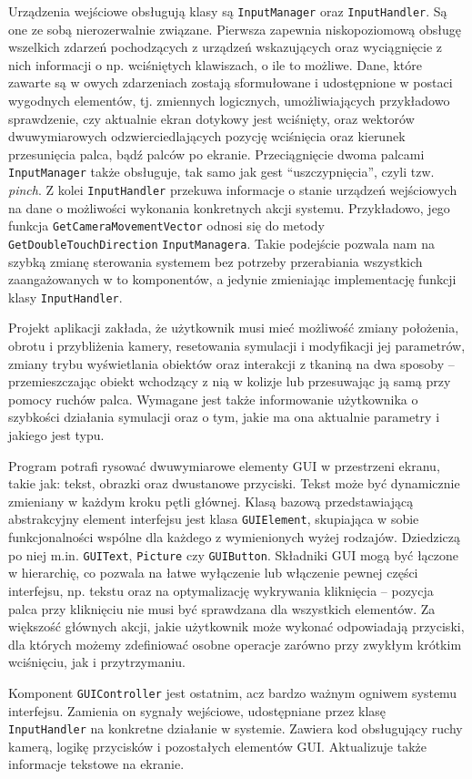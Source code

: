 		Urządzenia wejściowe obsługują klasy są \texttt{InputManager} oraz \texttt{InputHandler}. Są one ze sobą nierozerwalnie związane. Pierwsza zapewnia niskopoziomową obsługę wszelkich zdarzeń pochodzących z urządzeń wskazujących oraz wyciągnięcie z nich informacji o np. wciśniętych klawiszach, o ile to możliwe. Dane, które zawarte są w owych zdarzeniach zostają sformułowane i udostępnione w postaci wygodnych elementów, tj. zmiennych logicznych, umożliwiających przykładowo sprawdzenie, czy aktualnie ekran dotykowy jest wciśnięty, oraz wektorów dwuwymiarowych odzwierciedlających pozycję wciśnięcia oraz kierunek przesunięcia palca, bądź palców po ekranie. Przeciągnięcie dwoma palcami \texttt{InputManager} także obsługuje, tak samo jak gest ``uszczypnięcia'', czyli tzw. \emph{pinch}. Z kolei \texttt{InputHandler} przekuwa informacje o stanie urządzeń wejściowych na dane o możliwości wykonania konkretnych akcji systemu. Przykładowo, jego funkcja \texttt{GetCameraMovementVector} odnosi się do metody \texttt{GetDoubleTouchDirection} \texttt{InputManagera}. Takie podejście pozwala nam na szybką zmianę sterowania systemem bez potrzeby przerabiania wszystkich zaangażowanych w to komponentów, a jedynie zmieniając implementację funkcji klasy \texttt{InputHandler}. 
		
		Projekt aplikacji zakłada, że użytkownik musi mieć możliwość zmiany położenia, obrotu i przybliżenia kamery, resetowania symulacji i modyfikacji jej parametrów, zmiany trybu wyświetlania obiektów oraz interakcji z tkaniną na dwa sposoby -- przemieszczając obiekt wchodzący z nią w kolizje lub przesuwając ją samą przy pomocy ruchów palca. Wymagane jest także informowanie użytkownika o szybkości działania symulacji oraz o tym, jakie ma ona aktualnie parametry i jakiego jest typu. 
		
		Program potrafi rysować dwuwymiarowe elementy GUI w przestrzeni ekranu, takie jak: tekst, obrazki oraz dwustanowe przyciski.
		Tekst może być dynamicznie zmieniany w każdym kroku pętli głównej. Klasą bazową przedstawiającą abstrakcyjny element interfejsu jest klasa \texttt{GUIElement}, skupiająca w sobie funkcjonalności wspólne dla każdego z wymienionych wyżej rodzajów. Dziedziczą po niej m.in. \texttt{GUIText}, \texttt{Picture} czy \texttt{GUIButton}. Składniki GUI mogą być łączone w hierarchię, co pozwala na łatwe wyłączenie lub włączenie pewnej części interfejsu, np. tekstu oraz na optymalizację wykrywania kliknięcia -- pozycja palca przy kliknięciu nie musi być sprawdzana dla wszystkich elementów. Za większość głównych akcji, jakie użytkownik może wykonać odpowiadają przyciski, dla których możemy zdefiniować osobne operacje zarówno przy zwykłym krótkim wciśnięciu, jak i przytrzymaniu.
		
		Komponent \texttt{GUIController} jest ostatnim, acz bardzo ważnym ogniwem systemu interfejsu. Zamienia on sygnały wejściowe, udostępniane przez klasę \texttt{InputHandler} na konkretne działanie w systemie. Zawiera kod obsługujący ruchy kamerą, logikę przycisków i pozostałych elementów GUI. Aktualizuje także informacje tekstowe na ekranie.

